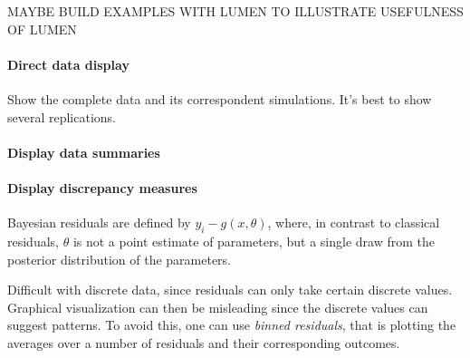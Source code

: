 \documentclass{article}
\begin{document}
MAYBE BUILD EXAMPLES WITH LUMEN TO ILLUSTRATE USEFULNESS OF LUMEN
\paragraph{Direct data display}

Show the complete data and its correspondent simulations. It's best to show several replications.

\paragraph{Display data summaries}

\paragraph{Display discrepancy measures}
Bayesian residuals are defined by $y_i - g(x,\theta)$, where, in contrast to classical residuals, $\theta$ is not a point estimate of parameters, but a single draw from the posterior distribution of the parameters.

Difficult with discrete data, since residuals can only take certain discrete values. Graphical visualization can then be misleading since the discrete values can suggest patterns. To avoid this, one can use \textit{binned residuals}, that is plotting the averages over a number of residuals and their corresponding outcomes. 
\end{document}
